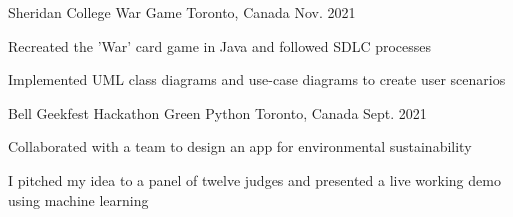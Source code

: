 \begin{cventries}
  \cventry
    {Sheridan College}
    {War Game}
    {Toronto, Canada}
    {Nov. 2021}
    {
      \begin{cvitems}
        \item {Recreated the 'War' card game in Java and followed SDLC processes
        \item  Implemented UML class diagrams and use-case diagrams to create user scenarios}
      \end{cvitems}
    }
  \cventry
    {Bell Geekfest Hackathon}
    {Green Python}
    {Toronto, Canada}
    {Sept. 2021}
    {
      \begin{cvitems}
        \item {Collaborated with a team to design an app for environmental sustainability
        \item I pitched my idea to a panel of twelve judges and presented a live working demo using machine learning}      \end{cvitems}
    }
\end{cventries}